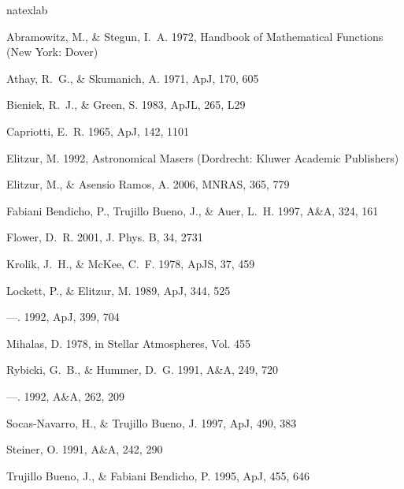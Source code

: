 \documentclass[12pt]{article}
\begin{document}
\begin{thebibliography}{17}
\expandafter\ifx\csname natexlab\endcsname\relax\def\natexlab#1{#1}\fi

{Abramowitz}, M., \& {Stegun}, I.~A. 1972, {Handbook of Mathematical Functions}
  (New York: Dover)

{Athay}, R.~G., \& {Skumanich}, A. 1971, ApJ, 170, 605

{Bieniek}, R.~J., \& {Green}, S. 1983, ApJL, 265, L29

{Capriotti}, E.~R. 1965, ApJ, 142, 1101

{Elitzur}, M. 1992, {Astronomical Masers} (Dordrecht: Kluwer Academic
  Publishers)

{Elitzur}, M., \& {Asensio Ramos}, A. 2006, MNRAS, 365, 779

{Fabiani Bendicho}, P., {Trujillo Bueno}, J., \& {Auer}, L.~H. 1997, A\&A, 324,
  161

{Flower}, D.~R. 2001, J. Phys. B, 34, 2731

{Krolik}, J.~H., \& {McKee}, C.~F. 1978, ApJS, 37, 459

{Lockett}, P., \& {Elitzur}, M. 1989, ApJ, 344, 525

---. 1992, ApJ, 399, 704

{Mihalas}, D. 1978, in {Stellar Atmospheres}, Vol. 455

{Rybicki}, G.~B., \& {Hummer}, D.~G. 1991, A\&A, 249, 720

---. 1992, A\&A, 262, 209

{Socas-Navarro}, H., \& {Trujillo Bueno}, J. 1997, ApJ, 490, 383

{Steiner}, O. 1991, A\&A, 242, 290

{Trujillo Bueno}, J., \& {Fabiani Bendicho}, P. 1995, ApJ, 455, 646

\end{thebibliography}


% 
% 
\end{document}
